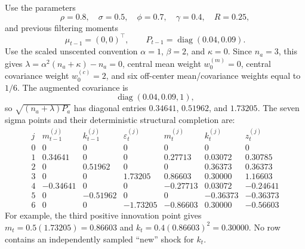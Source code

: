 Use the parameters
\[
  \rho=0.8,\quad \sigma=0.5,\quad \phi=0.7,\quad
  \gamma=0.4,\quad R=0.25,
\]
and previous filtering moments
\begin{equation}
  \mu_{t-1}=(0,0)^\top,
  \qquad
  P_{t-1}=\operatorname{diag}(0.04,0.09).
\end{equation}
Use the scaled unscented convention $\alpha=1$, $\beta=2$, and $\kappa=0$.
Since $n_a=3$, this gives $\lambda=\alpha^2(n_a+\kappa)-n_a=0$, central mean
weight $w_0^{(m)}=0$, central covariance weight $w_0^{(c)}=2$, and six
off-center mean/covariance weights equal to $1/6$.
The augmented covariance is
\[
  \operatorname{diag}(0.04,0.09,1),
\]
so $\sqrt{(n_a+\lambda)P_a}$ has diagonal entries
$0.34641$, $0.51962$, and $1.73205$.  The seven sigma points and their
deterministic structural completion are:
\[
\begin{array}{c|rrr|rrr}
  j
  & m_{t-1}^{(j)} & k_{t-1}^{(j)} & \varepsilon_t^{(j)}
  & m_t^{(j)} & k_t^{(j)} & z_t^{(j)}\\
  \hline
  0 & 0       & 0        & 0        & 0        & 0        & 0\\
  1 & 0.34641& 0        & 0        & 0.27713 & 0.03072 & 0.30785\\
  2 & 0      & 0.51962  & 0        & 0       & 0.36373 & 0.36373\\
  3 & 0      & 0        & 1.73205  & 0.86603 & 0.30000 & 1.16603\\
  4 & -0.34641& 0       & 0        & -0.27713& 0.03072 & -0.24641\\
  5 & 0      & -0.51962 & 0        & 0       & -0.36373& -0.36373\\
  6 & 0      & 0        & -1.73205 & -0.86603& 0.30000 & -0.56603
\end{array}
\]
For example, the third positive innovation point gives
$m_t=0.5(1.73205)=0.86603$ and
$k_t=0.4(0.86603)^2=0.30000$.  No row contains an independently sampled
``new'' shock for $k_t$.

